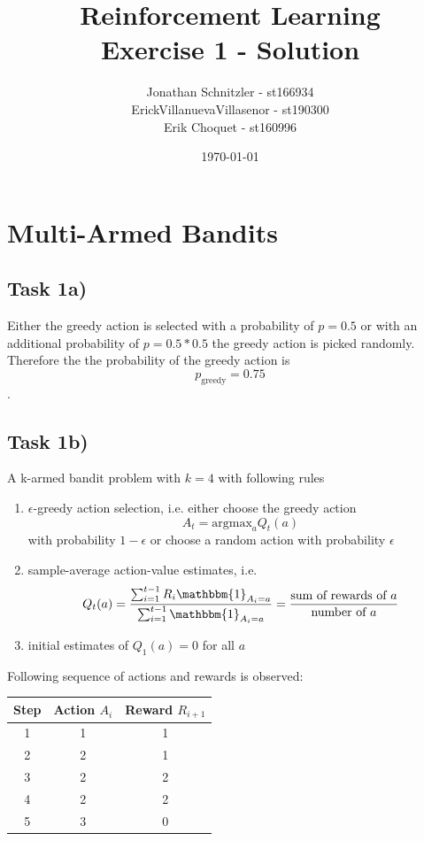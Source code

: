 \documentclass{article}
\title{Reinforcement Learning \\ Exercise 1 - Solution}
\author{Jonathan Schnitzler - st166934 \\
ErickVillanuevaVillasenor - st190300 \\
Erik Choquet - st160996}
\date{\today}
\begin{document}
\maketitle
\section{Multi-Armed Bandits}

\subsection*{Task 1a)}

Either the greedy action is selected with a probability of $p = 0.5$ or with an additional probability of $p = 0.5 * 0.5$ the greedy action is picked randomly. Therefore the the probability of the greedy action is 
$$p_{\text{greedy}} = 0.75$$.



\subsection*{Task 1b)}
A k-armed bandit problem with $k=4$ with following rules
\begin{enumerate}
    \item $\epsilon$-greedy action selection, i.e. either choose the greedy action 
    \begin{equation}
        A_t = \text{argmax}_a Q_t(a)
    \end{equation} with probability $1-\epsilon$ or choose a random action with probability $\epsilon$
    \item sample-average action-value estimates, i.e.
    \begin{equation}
        Q_t(a) = \frac{\sum_{i=1}^{t-1}R_i \mathbbm{1}_{A_i = a}}{\sum_{i=1}^{t-1} \mathbbm{1}_{A_i = a}} = \frac{\text{sum of rewards of $a$}}{\text{number of $a$}}
    \end{equation}
    \item initial estimates of $Q_1(a) = 0$ for all $a$
\end{enumerate}

Following sequence of actions and rewards is observed:
\begin{table}[H]
\centering
\begin{tabular}{|c|c|c|}
\hline
Step & Action $A_i$ & Reward $R_{i+1}$ \\ \hline
1 & 1 & 1 \\
2 & 2 & 1 \\
3 & 2 & 2 \\
4 & 2 & 2 \\
5 & 3 & 0 \\
\hline
\end{tabular}
\end{table}
\end{document}
